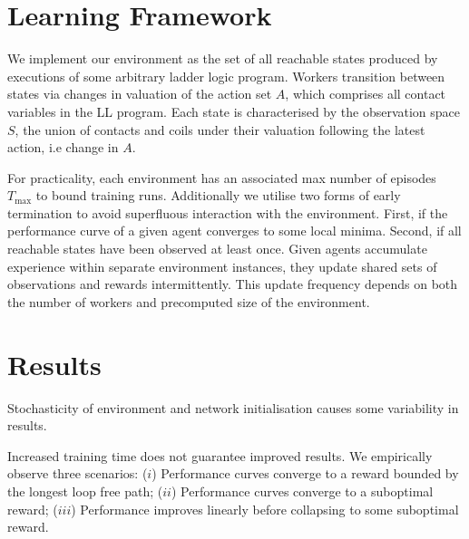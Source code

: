 \documentclass[runningheads]{llncs}
\begin{document}
\section{Learning Framework}
We implement our environment as the set of all reachable states produced by executions of some arbitrary ladder logic program. Workers transition between states via changes in valuation of the action set $A$, which comprises all contact variables in the LL program. Each state is characterised by the observation space $S$, the union of contacts and coils under their valuation following the latest action, i.e change in $A$.

For practicality, each environment has an associated max number of episodes $T_{\max}$ to bound training runs. Additionally we utilise two forms of early termination to avoid superfluous interaction with the environment. First, if the performance curve of a given agent converges to some local minima. Second, if all reachable states have been observed at least once. Given agents accumulate experience within separate environment instances, they update shared sets of observations and rewards intermittently. This update frequency depends on both the number of workers and precomputed size of the environment.

\section{Results}
Stochasticity of environment and network initialisation causes some variability in results. 

Increased training time does not guarantee improved results. We empirically observe three scenarios: ($i$) Performance curves converge to a reward bounded by the longest loop free path; ($ii$) Performance curves converge to a suboptimal reward; ($iii$) Performance improves linearly before collapsing to some suboptimal reward.
\end{document}
